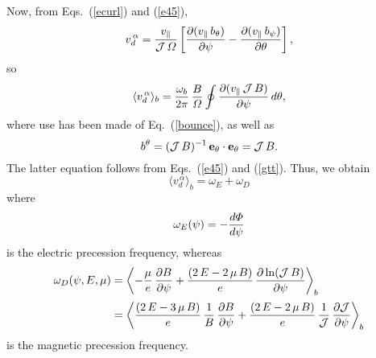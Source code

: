 \documentclass[12pt,prb,aps,notitlepage]{revtex4-1}
\begin{document}
 Now, from Eqs.~(\ref{ecurl}) and (\ref{e45}), 
 \begin{equation}
 v_d^{\,\alpha}= \frac{v_\parallel}{{\cal J}\,{\mit\Omega}}\left[\frac{\partial (v_\parallel\,b_\theta)}{\partial\psi} - \frac{\partial (v_\parallel\,b_\psi)}{\partial \theta}\right],
 \end{equation}
 so
 \begin{equation}
 \langle v_d^{\,\alpha}\rangle_b = \frac{\omega_b}{2\pi}\,\frac{B}{{\mit\Omega}}\oint\frac{\partial (v_\parallel\,{\cal J}\,B)}{\partial\psi}\,d\theta,
 \end{equation}
 where use has been made of Eq.~(\ref{bounce}), as well as 
 \begin{equation}
 b^\theta = ({\cal J}\,B)^{-1}\,{\bf e}_\theta\cdot{\bf e}_\theta= {\cal J}\,B.
 \end{equation}
 The latter equation follows from Eqs.~(\ref{e45}) and (\ref{gtt}). Thus, we obtain 
 \begin{equation}\label{e98}
  \langle v_d^{\,\alpha}\rangle_b=\omega_E +\omega_D
 \end{equation}
 where 
 \begin{equation}
 \omega_E(\psi)= -\frac{d{\mit\Phi}}{d\psi}
 \end{equation}
 is the  electric precession frequency, whereas 
 \begin{align}
 \omega_D(\psi,E,\mu)&=\left\langle- \frac{\mu}{e}\,\frac{\partial B}{\partial\psi} +\frac{(2\,E-2\,\mu\,B)}{e}\,\frac{\partial \ln({\cal J}\,B)}{\partial\psi}
 \right\rangle_b\nonumber\\[0.5ex]
 &=\left\langle\frac{(2\,E-3\,\mu\,B)}{e}\,\frac{1}{B}\,\frac{\partial B}{\partial\psi} +\frac{(2\,E-2\,\mu\,B)}{e}\,\frac{1}{\cal J}\,\frac{\partial{\cal J}}{\partial\psi}
 \right\rangle_b
 \end{align}
 is the magnetic precession frequency. 
 
\end{document}
